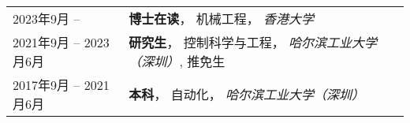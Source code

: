 %
%



\begin{tabular}{ll}	
	\textsc{2023年9月 -- }			  & \textbf{博士在读}， 机械工程， \emph{香港大学}\\
	\textsc{2021年9月 -- 2023月6月} 	&  \textbf{研究生}， 控制科学与工程， \emph{哈尔滨工业大学（深圳）}, 推免生\\
	\textsc{2017年9月 -- 2021月6月} 	&  \textbf{本科}， 自动化， \emph{哈尔滨工业大学（深圳）}\\
									
\end{tabular}